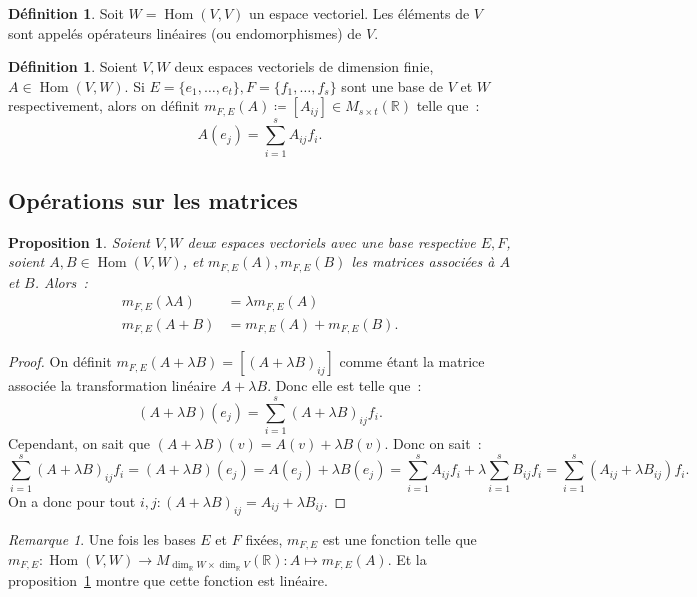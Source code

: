 \documentclass{article}
\DeclareMathOperator{\Hom}{Hom}
\newcommand{\R}{\mathbb R}
\newcommand{\M}[3]{M_{#1 \times #2}(#3)}
\newtheorem{prp}[thm]{Proposition}
\theoremstyle{definition}
\newtheorem{déf}[thm]{Définition}
\theoremstyle{remark}
\newtheorem*{rmq}{Remarque}
\begin{document}
		\begin{déf} Soit $W = \Hom(V, V)$ un espace vectoriel. Les éléments de $V$ sont appelés opérateurs linéaires (ou endomorphismes) de $V$. \end{déf}

		\begin{déf} Soient $V, W$ deux espaces vectoriels de dimension finie, $A \in \Hom(V, W)$. Si $E = \{e_1, \dotsc, e_t\}, F = \{f_1, \dotsc, f_s\}$ sont une
		base de $V$ et $W$ respectivement, alors on définit $m_{F, E}(A) \coloneqq [A_{ij}] \in \M st\R$ telle que~: \[A(e_j) = \sum_{i=1}^sA_{ij}f_i.\] \end{déf}

	\subsection{Opérations sur les matrices}
		\begin{prp}\label{linéaritéMatrices} Soient $V, W$ deux espaces vectoriels avec une base respective $E, F$, soient $A, B \in \Hom(V, W)$,
		et $m_{F, E}(A), m_{F, E}(B)$ les matrices associées à $A$ et $B$. Alors~:
		\begin{align*}
			m_{F, E}(\lambda A) &= \lambda m_{F, E}(A) \\
			m_{F, E}(A + B) &= m_{F, E}(A) + m_{F, E}(B).
		\end{align*}
		\end{prp}

		\begin{proof} On définit $m_{F, E}(A + \lambda B) = [(A+ \lambda B)_{ij}]$ comme étant la matrice associée la transformation linéaire $A+\lambda B$. Donc elle est
		telle que~: \[(A+\lambda B)(e_j) = \sum_{i=1}^s(A + \lambda B)_{ij}f_i.\] Cependant, on sait que $(A+\lambda B)(v) = A(v) + \lambda B(v)$. Donc on sait~:
		\[\sum_{i=1}^s(A + \lambda B)_{ij}f_i = (A+\lambda B)(e_j) = A(e_j) + \lambda B(e_j) = \sum_{i=1}^sA_{ij}f_i + \lambda\sum_{i=1}^sB_{ij}f_i
		= \sum_{i=1}^s(A_{ij} + \lambda B_{ij})f_i.\] On a donc pour tout $i, j : (A+\lambda B)_{ij} = A_{ij} + \lambda B_{ij}$. \end{proof}

		\begin{rmq} Une fois les bases $E$ et $F$ fixées, $m_{F, E}$ est une fonction telle que
		$m_{F, E} : \Hom(V, W) \to \M {\dim_\R W}{\dim_\R V}\R : A \mapsto m_{F, E}(A)$.
		Et la proposition~\ref{linéaritéMatrices} montre que cette fonction est linéaire. \end{rmq}
\end{document}
